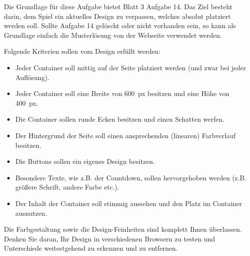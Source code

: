 %
\par Die Grundlage für diese Aufgabe bietet Blatt 3 Aufgabe 14. Das Ziel
besteht darin, dem Spiel ein aktuelles Design zu verpassen, welches absolut
platziert werden soll. Sollte Aufgabe 14 gelöscht oder nicht vorhanden sein,
so kann als Grundlage einfach die Musterlösung von der Webseite verwendet
werden.
%
\par Folgende Kriterien sollen vom Design erfüllt werden:
%
\begin{itemize}
\item
Jeder Container soll mittig auf der Seite platziert werden (und zwar bei jeder
Auflösung).
\item
Jeder Container soll eine Breite von \qty{600}{px} besitzen und eine Höhe von
\qty{400}{px}.
\item
Die Container sollen runde Ecken besitzen und einen Schatten werfen.
\item
Der Hintergrund der Seite soll einen ansprechenden (linearen) Farbverlauf
besitzen.
\item
Die Buttons sollen ein eigenes Design besitzen.
\item
Besondere Texte, wie z.B. der Countdown, sollen hervorgehoben werden (z.B.
größere Schrift, andere Farbe etc.).
\item
Der Inhalt der Container soll stimmig aussehen und den Platz im Container
ausnutzen.
\end{itemize}
%
\par Die Farbgestaltung sowie die Design-Feinheiten sind komplett Ihnen
überlassen. Denken Sie daran, Ihr Design in verschiedenen Browsern zu testen
und Unterschiede weitestgehend zu erkennen und zu entfernen.